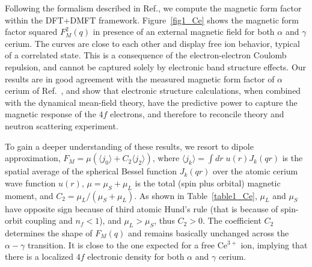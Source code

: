 \documentclass[10pt]{ruthesis}
\begin{document}
{%

Following the formalism described in Ref.\cite{mariettaMFF}, we
compute the magnetic form factor within the DFT+DMFT framework.
Figure~\ref{fig1_Ce} shows the magnetic form factor squared $F_M^{2}(q)$
in presence of an external magnetic field for both $\alpha$ and
$\gamma$ cerium.  The curves are close to each other and display free
ion behavior, typical of a correlated state. This is a consequence of
the electron-electron Coulomb repulsion, and cannot be captured solely
by electronic band structure effects. Our results are in good
agreement with the measured magnetic form factor of $\alpha$ cerium of
Ref.~\cite{murani}, and show that electronic structure calculations,
when combined with the dynamical mean-field theory, have the
predictive power to capture the magnetic response of the $4f$
electrons, and therefore to reconcile theory and neutron scattering
experiment.

To gain a deeper understanding of these results, we resort to dipole
approximation, $F_M = \mu (\langle j_0 \rangle + C_2
\langle j_2 \rangle)$, where $\langle j_k \rangle = \int dr\; u(r)
J_k(qr)$ is the spatial average of the spherical Bessel function
$J_k(qr)$ over the atomic cerium wave function $u(r)$,
$\mu=\mu_S+\mu_L$ is the total (spin plus orbital) magnetic moment,
and $C_2 = \mu_L/(\mu_S + \mu_L)$.  As shown in Table~\ref{table1_Ce},
$\mu_L$ and $\mu_S$ have opposite sign because of third atomic Hund's
rule (that is because of spin-orbit coupling and $n_f<1$), and
$\mu_L>\mu_S$, thus $C_2>0$.  The coefficient $C_2$ determines the
shape of $F_M(q)$ and remains basically unchanged across the
$\alpha-\gamma$ transition. It is close to the one expected for a free
Ce$^{3+}$ ion, implying that there is a localized $4f$ electronic
density for both $\alpha$ and $\gamma$ cerium.





}
\end{document}
